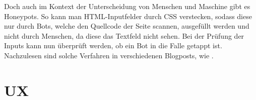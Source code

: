 Doch auch im Kontext der Unterscheidung von Menschen und Maschine gibt es Honeypots. 
So kann man HTML-Inputfelder durch CSS verstecken, sodass diese nur durch Bots, welche den Quellcode der Seite scannen, ausgefüllt werden 
und nicht durch Menschen, da diese das Textfeld nicht sehen. 
Bei der Prüfung der Inputs kann nun überprüft werden, ob ein Bot in die Falle getappt ist. 
Nachzulesen sind solche Verfahren in verschiedenen Blogposts, wie \cite{perry:2019}.


\section{UX}

